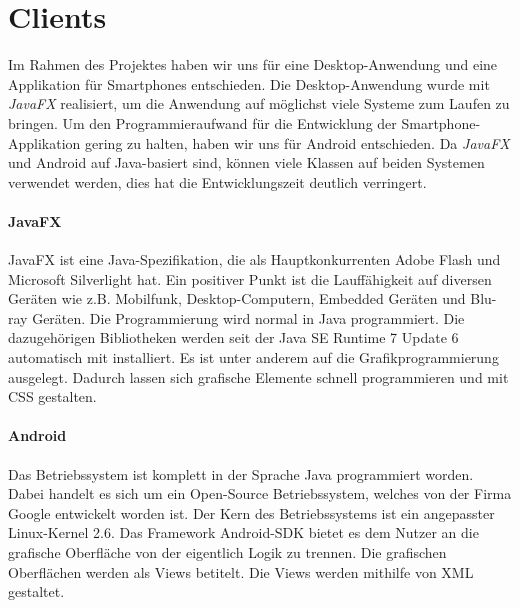 
\chapter{Clients}
Im Rahmen des Projektes haben wir uns für eine Desktop-Anwendung und eine Applikation für Smartphones entschieden. Die Desktop-Anwendung wurde mit \textit{JavaFX} realisiert, um die Anwendung auf möglichst viele Systeme zum Laufen zu bringen. Um den Programmieraufwand für die Entwicklung der Smartphone-Applikation gering zu halten, haben wir uns für Android entschieden. Da \textit{JavaFX} und Android auf Java-basiert sind, können viele Klassen auf beiden Systemen verwendet werden, dies hat die Entwicklungszeit deutlich verringert.

\subsubsection{JavaFX}
JavaFX ist eine Java-Spezifikation, die als Hauptkonkurrenten Adobe Flash und Microsoft Silverlight hat. Ein positiver Punkt ist die Lauffähigkeit auf diversen Geräten wie z.B. Mobilfunk, Desktop-Computern, Embedded Geräten und Blu-ray Geräten. Die Programmierung wird normal in Java programmiert. Die dazugehörigen Bibliotheken werden seit der Java SE Runtime 7 Update 6 automatisch mit installiert. Es ist unter anderem auf die Grafikprogrammierung ausgelegt. Dadurch lassen sich grafische Elemente schnell programmieren und mit CSS gestalten\cite{bib.jFXRaspPi}.

\subsubsection{Android}
Das Betriebssystem ist komplett in der Sprache Java programmiert worden. Dabei handelt es sich um ein Open-Source Betriebssystem, welches von der Firma Google entwickelt worden ist. Der Kern des Betriebssystems ist ein angepasster Linux-Kernel 2.6. Das Framework Android-SDK bietet es dem Nutzer an die grafische Oberfläche von der eigentlich Logik zu trennen. Die grafischen Oberflächen werden als Views betitelt. Die Views werden mithilfe von XML gestaltet.
\newpage
